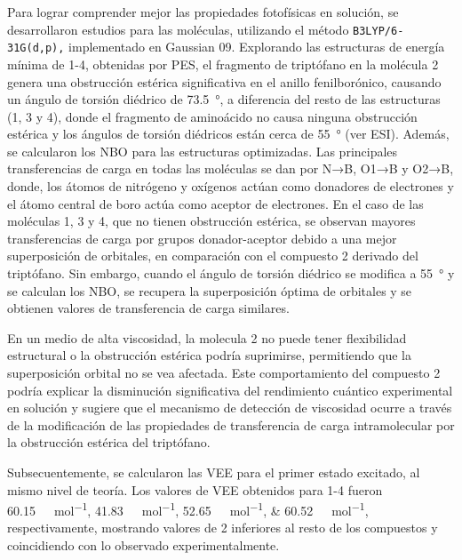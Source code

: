 \documentclass[spanish,mexico]{scrartcl}
\begin{document}
Para lograr comprender mejor las propiedades fotofísicas en solución, se desarrollaron estudios \insilico{} para las moléculas, utilizando el método \texttt{B3LYP/6-31G(d,p),} implementado en Gaussian 09. Explorando las estructuras de energía mínima de 1-4, obtenidas por \gls{PES}, el fragmento de triptófano en la molécula 2 genera una obstrucción estérica significativa en el anillo fenilborónico, causando un ángulo de torsión diédrico de \qty{73.5}{\degree}, a diferencia del resto de las estructuras (1, 3 y 4), donde el fragmento de aminoácido no causa ninguna obstrucción estérica y los ángulos de torsión diédricos están cerca de \qty{55}{\degree} (ver ESI). Además, se calcularon los \gls{NBO} para las estructuras optimizadas.
Las principales transferencias de carga en todas las moléculas se dan por N→B, O1→B y O2→B, donde, los átomos de nitrógeno y oxígenos actúan como donadores de electrones y el átomo central de boro actúa como aceptor de electrones. En el caso de las moléculas 1, 3 y 4, que no tienen obstrucción estérica, se observan mayores transferencias de carga por grupos donador-aceptor debido a una mejor superposición de orbitales, en comparación con el compuesto 2 derivado del triptófano. Sin embargo, cuando el ángulo de torsión diédrico se modifica a \qty{55}{\degree} y se calculan los \gls{NBO}, se recupera la superposición óptima de orbitales y se obtienen valores de transferencia de carga similares.

En un medio de alta viscosidad, la molecula 2 no puede tener flexibilidad estructural o la obstrucción estérica podría suprimirse, permitiendo que la superposición orbital no se vea afectada. Este comportamiento del compuesto 2 podría explicar la disminución significativa del rendimiento cuántico experimental en solución y sugiere que el mecanismo de detección de viscosidad ocurre a través de la modificación de las propiedades de transferencia de carga intramolecular por la obstrucción estérica del triptófano.

Subsecuentemente, se calcularon las \gls{VEE} para el primer estado excitado, al mismo nivel de teoría. Los valores de \gls{VEE} obtenidos para 1-4 fueron \qtylist[list-units = bracket]{60.15;41.83;52.65;60.52}{\kilo\cal\per\mol}, respectivamente, mostrando valores de 2 inferiores al resto de los compuestos y coincidiendo con lo observado experimentalmente. 
\end{document}
